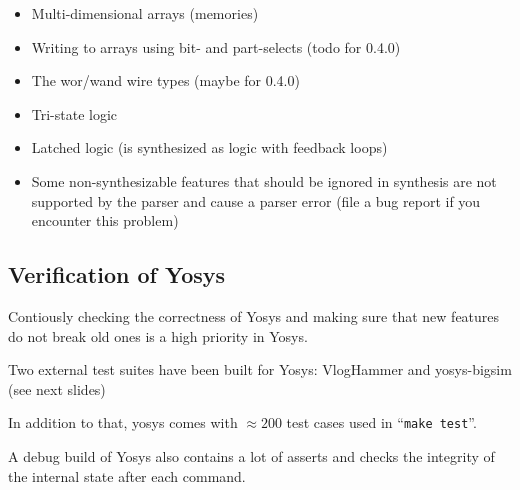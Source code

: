 \begin{frame}{\subsecname}
\begin{itemize}
\item Multi-dimensional arrays (memories)
\item Writing to arrays using bit- and part-selects (todo for 0.4.0)
\item The wor/wand wire types (maybe for 0.4.0)
\item Tri-state logic

\bigskip
\item Latched logic (is synthesized as logic with feedback loops)
\item Some non-synthesizable features that should be ignored in synthesis are not supported by the parser and cause a parser error (file a bug report if you encounter this problem)
\end{itemize}
\end{frame}


\subsection{Verification of Yosys}

\begin{frame}{\subsecname}
Contiously checking the correctness of Yosys and making sure that new features
do not break old ones is a high priority in Yosys.

\bigskip
Two external test suites have been built for Yosys: VlogHammer and yosys-bigsim
(see next slides)

\bigskip
In addition to that, yosys comes with $\approx\!200$ test cases used in ``{\tt make test}''.

\bigskip
A debug build of Yosys also contains a lot of asserts and checks the integrity of
the internal state after each command.
\end{frame}

